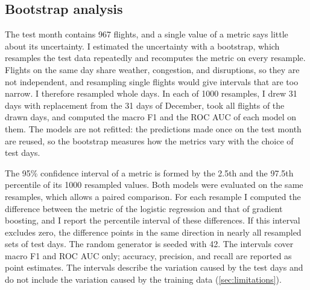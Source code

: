 \subsection{Bootstrap analysis}\label{sec:bootstrap}

The test month contains 967 flights, and a single value of a metric says little about its uncertainty. I estimated the uncertainty with a bootstrap, which resamples the test data repeatedly and recomputes the metric on every resample. Flights on the same day share weather, congestion, and disruptions, so they are not independent, and resampling single flights would give intervals that are too narrow. I therefore resampled whole days. In each of 1000 resamples, I drew 31 days with replacement from the 31 days of December, took all flights of the drawn days, and computed the macro F1 and the ROC AUC of each model on them. The models are not refitted: the predictions made once on the test month are reused, so the bootstrap measures how the metrics vary with the choice of test days.

The 95\% confidence interval of a metric is formed by the 2.5th and the 97.5th percentile of its 1000 resampled values. Both models were evaluated on the same resamples, which allows a paired comparison. For each resample I computed the difference between the metric of the logistic regression and that of gradient boosting, and I report the percentile interval of these differences. If this interval excludes zero, the difference points in the same direction in nearly all resampled sets of test days. The random generator is seeded with 42. The intervals cover macro F1 and ROC AUC only; accuracy, precision, and recall are reported as point estimates. The intervals describe the variation caused by the test days and do not include the variation caused by the training data (\cref{sec:limitations}).
